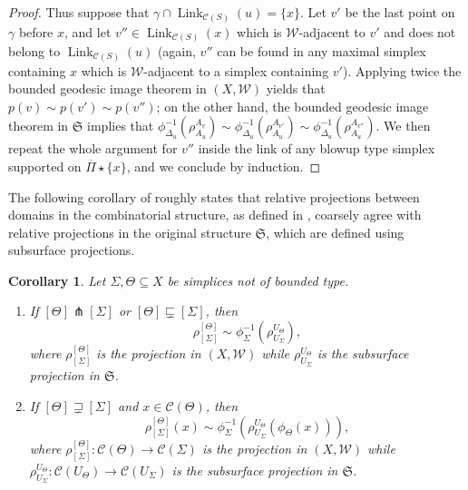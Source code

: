 \documentclass[svgnames]{amsart}
\theoremstyle{plain}
\newtheorem{cor}[thm]{Corollary}
\theoremstyle{definition}
\newcommand{\frakS}{\mathfrak S}
\newcommand{\C}[1]{\mathcal{C}(#1)}
\newcommand{\propnest}{\sqsubsetneq}
\newcommand{\transverse}{\pitchfork}
\newcommand{\link}[2]{\operatorname{Link}_{#1}\left(#2\right)}
\newcommand{\W}{\mathcal{W}}
\newcommand{\ov}[1]{\overline{#1}}
\begin{document}
\begin{proof}
    Thus suppose that  $\gamma\cap\link{\C S}{u}=\{x\}$. Let $v'$ be the last point on $\gamma$ before $x$, and let $v''\in \link{\C S}{x}$ which is $\W$-adjacent to $v'$ and does not belong to $\link{\C S}{u}$ (again, $v''$ can be found in any maximal simplex containing $x$ which is $\W$-adjacent to a simplex containing $v'$). Applying twice the bounded geodesic image theorem in $(X,\W)$ yields that $p(v)\sim p(v')\sim p(v'')$; on the other hand, the bounded geodesic image theorem in $\frakS$ implies that $\phi_{\Delta_u}^{-1}(\rho^{A_v}_{A_u})\sim \phi_{\Delta_u}^{-1}(\rho^{A_{v'}}_{A_u})\sim \phi_{\Delta_u}^{-1}(\rho^{A_{v''}}_{A_u})$. We then repeat the whole argument for $v''$ inside the link of any blowup type simplex supported on $\ov \Pi\star\{x\}$, and we conclude by induction.
    \end{proof}

    \noindent The following corollary of  roughly states that relative projections between domains in the combinatorial structure, as defined in , coarsely agree with relative projections in the original structure $\frakS$, which are defined using subsurface projections. 
    \begin{cor}\label{cor:consistency_is_the_same} Let $\Sigma,\Theta\subseteq X$ be simplices not of bounded type.
    \begin{enumerate}
        \item\label{item:consistency1} If $[\Theta]\transverse[\Sigma]$ or $[\Theta]\propnest [\Sigma]$, then 
        $$\rho^{[\Theta]}_{[\Sigma]}\sim  \phi_\Sigma^{-1}\left(\rho^{U_\Theta}_{U_\Sigma}\right),$$
        where $\rho^{[\Theta]}_{[\Sigma]}$ is the projection in $(X,\W)$ while $\rho^{U_\Theta}_{U_\Sigma}$ is the subsurface projection in $\frakS$.
        \item\label{item:consistency2}  If $[\Theta]\sqsupsetneq[\Sigma]$ and $x\in \C{\Theta}$, then  
        $$\rho^{[\Theta]}_{[\Sigma]}(x)\sim  \phi_\Sigma^{-1}\left(\rho^{U_\Theta}_{U_\Sigma}(\phi_\Theta(x))\right),$$
        where $\rho^{[\Theta]}_{[\Sigma]}\colon \C{\Theta}\to \C{\Sigma}$ is the projection in $(X,\W)$ while $\rho^{U_\Theta}_{U_\Sigma}\colon \C{U_\Theta}\to \C{U_\Sigma}$ is the subsurface projection in $\frakS$.
    \end{enumerate}
    \end{cor}
\end{document}
